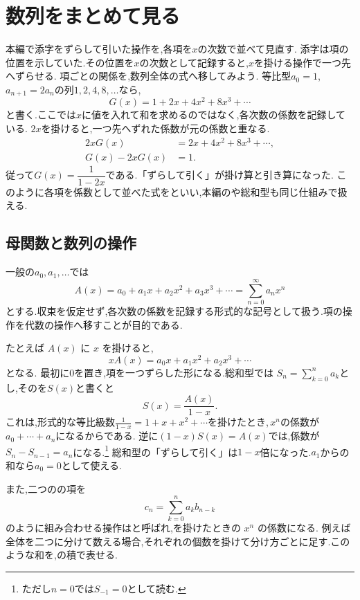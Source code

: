 
\section{数列をまとめて見る}\label{節：数列全体を一つの対象にまとめると,何が見えるか}

本編で添字をずらして引いた操作を,各項を$x$の次数で並べて見直す.
添字は項の位置を示していた.その位置を$x$の次数として記録すると,$x$を掛ける操作で一つ先へずらせる.
項ごとの関係を,数列全体の式へ移してみよう.
等比型$a_0=1$, $a_{n+1}=2a_n$の列$1,2,4,8,\ldots$なら,
\[
  G(x)=1+2x+4x^2+8x^3+\cdots
\]
と書く.ここでは$x$に値を入れて和を求めるのではなく,各次数の係数を記録している.
$2x$を掛けると,一つ先へずれた係数が元の係数と重なる.
\[
  \begin{aligned}
    2xG(x)&=2x+4x^2+8x^3+\cdots,\\
    G(x)-2xG(x)&=1.
  \end{aligned}
\]
従って$G(x)=\dfrac{1}{1-2x}$である.「ずらして引く」が掛け算と引き算になった.
このように各項を係数として並べた式をといい,本編のや総和型も同じ仕組みで扱える.

\subsection{母関数と数列の操作}
一般の$a_0,a_1,\ldots$では
\[
  A(x)=a_0+a_1x+a_2x^2+a_3x^3+\cdots
  =\sum_{n=0}^{\infty}a_nx^n
\]
とする.収束を仮定せず,各次数の係数を記録する形式的な記号として扱う.項の操作を代数の操作へ移すことが目的である.

たとえば $A(x)$ に $x$ を掛けると,
\[
  xA(x)=a_0x+a_1x^2+a_2x^3+\cdots
\]
となる.
最初に$0$を置き,項を一つずらした形になる.総和型では
$S_n=\sum_{k=0}^n a_k$とし,そのを$S(x)$と書くと
\[
  S(x)=\frac{A(x)}{1-x}.
\]
これは,形式的な等比級数$\displaystyle \frac{1}{1-x}=1+x+x^2+\cdots$を掛けたとき,\,$x^n$の係数が$a_0+\cdots+a_n$になるからである.
逆に$(1-x)S(x)=A(x)$では,係数が$S_n-S_{n-1}=a_n$になる.\footnote{ただし$n=0$では$S_{-1}=0$として読む.}
総和型の「ずらして引く」は$1-x$倍になった.$a_1$からの和なら$a_0=0$として使える.

また,二つのの項を
\[
  c_n=\sum_{k=0}^{n}a_kb_{n-k}
\]
のように組み合わせる操作はと呼ばれ,を掛けたときの $x^n$ の係数になる.
例えば全体を二つに分けて数える場合,それぞれの個数を掛けて分け方ごとに足す.このような和を,の積で表せる.

